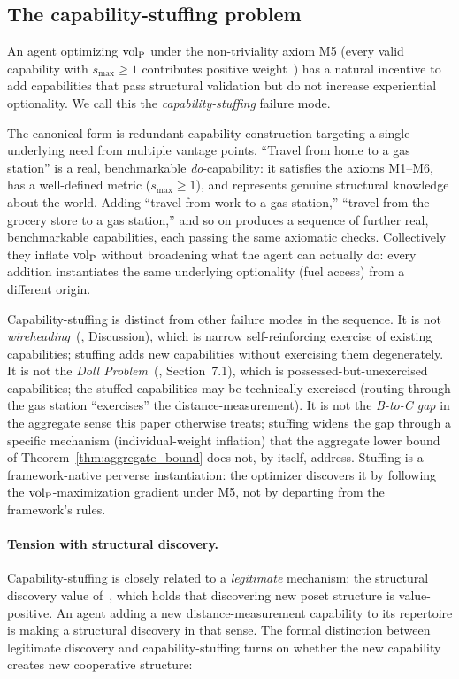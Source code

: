\subsection{The capability-stuffing problem}
\label{sec:capability_stuffing}

An agent optimizing ${\operatorname{vol}_{\mathrm{P}}}$ under the non-triviality axiom M5
(every valid capability with $s_{\max} \geq 1$ contributes
positive weight~\citep[Proposition~1]{lasser2026poset}) has a
natural incentive to add capabilities that pass structural
validation but do not increase experiential optionality.  We call
this the \emph{capability-stuffing} failure mode.

The canonical form is redundant capability construction targeting
a single underlying need from multiple vantage points.  ``Travel
from home to a gas station'' is a real, benchmarkable
\emph{do}-capability: it satisfies the axioms M1--M6, has a
well-defined metric ($s_{\max} \geq 1$), and represents genuine
structural knowledge about the world.  Adding ``travel from work
to a gas station,'' ``travel from the grocery store to a gas
station,'' and so on produces a sequence of further real,
benchmarkable capabilities, each passing the same axiomatic
checks.  Collectively they inflate ${\operatorname{vol}_{\mathrm{P}}}$ without broadening
what the agent can actually do: every addition instantiates the
same underlying optionality (fuel access) from a different
origin.

Capability-stuffing is distinct from other failure modes in the
sequence.  It is not \emph{wireheading}~(\cite{lasser2026exo},
Discussion), which is narrow self-reinforcing exercise of
existing capabilities; stuffing adds new capabilities without
exercising them degenerately.  It is not the \emph{Doll
Problem}~(\cite{lasser2026gfm}, Section~7.1), which is
possessed-but-unexercised capabilities; the stuffed capabilities
may be technically exercised (routing through the gas station
``exercises'' the distance-measurement).  It is not the
\emph{B-to-C gap} in the aggregate sense this paper otherwise
treats; stuffing widens the gap through a specific mechanism
(individual-weight inflation) that the aggregate lower bound of
Theorem~\ref{thm:aggregate_bound} does not, by itself, address.
Stuffing is a framework-native perverse instantiation: the
optimizer discovers it by following the ${\operatorname{vol}_{\mathrm{P}}}$-maximization
gradient under M5, not by departing from the framework's rules.

\paragraph{Tension with structural discovery.}
Capability-stuffing is closely related to a \emph{legitimate}
mechanism: the structural discovery value
of~\citep[Proposition~2]{lasser2026horizon}, which holds that
discovering new poset structure is value-positive.  An agent
adding a new distance-measurement capability to its repertoire is
making a structural discovery in that sense.  The formal
distinction between legitimate discovery and capability-stuffing
turns on whether the new capability creates new cooperative
structure:

